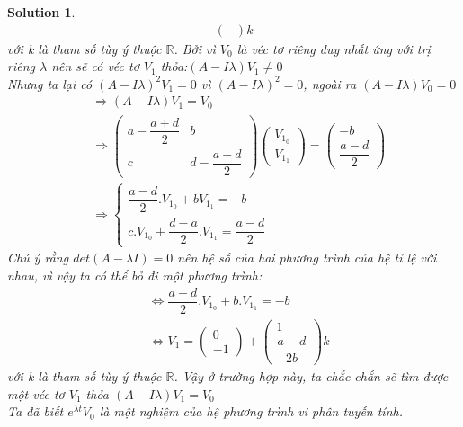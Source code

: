 \documentclass[a4paper]{article}
\newtheorem*{sol}{Solution}
\begin{document}
\begin{sol}
\begin{align*}
\begin{pmatrix}
    \end{pmatrix}k
\end{align*}
với k là tham số tùy ý thuộc $\mathbb{R}$. Bởi vì $V_0$ là véc tơ riêng duy nhất ứng với trị riêng $\lambda$ nên sẽ có véc tơ $V_1$ thỏa:\hspace{0.25cm}$(A-I\lambda)V_1 \neq 0$\\
Nhưng ta lại có $(A-I\lambda)^2V_1=0$ vì $(A-I \lambda)^2=0$, ngoài ra $(A-I\lambda) V_0=0$
\begin{align*}
    &\Rightarrow (A- I \lambda)V_1=V_0\\
    &\Rightarrow \begin{pmatrix}
    a- \dfrac{a+d}{2} & b\\ 
    c & d- \dfrac{a+d}{2}
    \end{pmatrix}\begin{pmatrix}
    V_{1_0}\\ V_{1_1} 
    \end{pmatrix} =\begin{pmatrix}
    -b\\ \dfrac{a-d}{2}
    \end{pmatrix}\\
    &\Rightarrow \left\{\begin{matrix}
    \dfrac{a-d}{2}. V_{1_0} + bV_{1_1} = -b\\ 
    c. V_{1_0} +\dfrac{d-a}{2}.V_{1_1}=\dfrac{a-d}{2}
    \end{matrix}\right.
\end{align*}
Chú ý rằng $det(A-\lambda I) = 0$ nên hệ số của hai phương trình của hệ tỉ lệ với nhau, vì vậy ta có thể bỏ đi một phương trình: 
\begin{align*}
    &\Leftrightarrow \dfrac{a-d}{2}.V_{1_0}+b.V_{1_1}=-b\\
    &\Leftrightarrow V_1=\begin{pmatrix}
    0\\-1 
    \end{pmatrix}+\begin{pmatrix}
    1\\ \dfrac{a-d}{2b}
    \end{pmatrix}k
\end{align*}
với k là tham số tùy ý thuộc $\mathbb{R}$.
\newline
Vậy ở trường hợp này, ta chắc chắn sẽ tìm được một véc tơ $V_1$ thỏa $(A-I\lambda)V_1=V_0$\\
Ta đã biết $e^{\lambda t}V_0$ là một nghiệm của hệ phương trình vi phân tuyến tính.\\

\end{sol}
\end{document}
